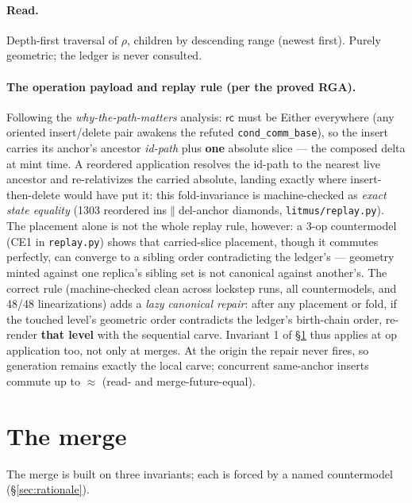 \documentclass[11pt]{article}
\begin{document}
\paragraph{Read.} Depth-first traversal of $\rho$, children by descending
range (newest first). Purely geometric; the ledger is never consulted.

\paragraph{The operation payload and replay rule (per the proved RGA).}
Following the \emph{why-the-path-matters} analysis: $\mathsf{rc}$ must be
\textsf{Either} everywhere (any oriented insert/delete pair awakens the
refuted \texttt{cond\_comm\_base}), so the insert carries its anchor's
ancestor \emph{id-path} plus \textbf{one} absolute slice --- the composed
delta at mint time. A reordered application resolves the id-path to the
nearest live ancestor and re-relativizes the carried absolute, landing
exactly where insert-then-delete would have put it: this fold-invariance
is machine-checked as \emph{exact state equality} (1303 reordered
ins$\parallel$del-anchor diamonds, \texttt{litmus/replay.py}). The
placement alone is not the whole replay rule, however: a 3-op
countermodel (CE1 in \texttt{replay.py}) shows that carried-slice
placement, though it commutes perfectly, can converge to a sibling order
contradicting the ledger's --- geometry minted against one replica's
sibling set is not canonical against another's. The correct rule
(machine-checked clean across lockstep runs, all countermodels, and 48/48
linearizations) adds a \emph{lazy canonical repair}: after any placement
or fold, if the touched level's geometric order contradicts the ledger's
birth-chain order, re-render \textbf{that level} with the sequential
carve. Invariant 1 of \S\ref{sec:merge} thus applies at op application
too, not only at merges. At the origin the repair never fires, so
generation remains exactly the local carve; concurrent same-anchor
inserts commute up to $\approx$ (read- and merge-future-equal).

\section{The merge}
\label{sec:merge}

The merge is built on three invariants; each is forced by a named
countermodel (\S\ref{sec:rationale}).
\end{document}
